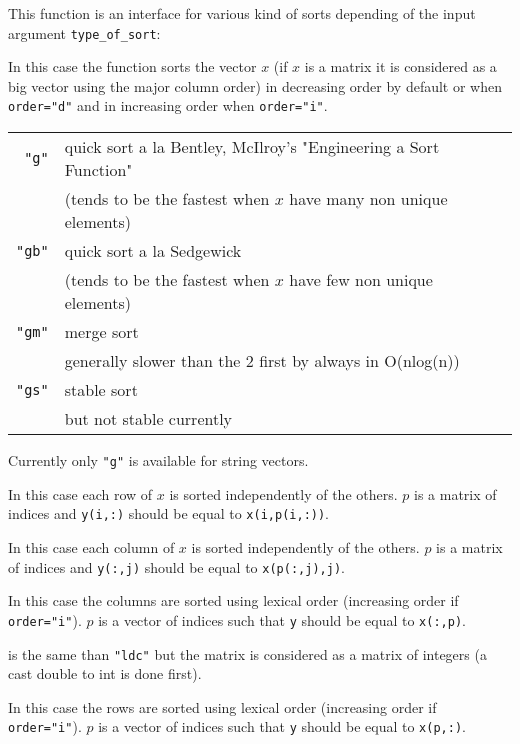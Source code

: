 \begin{mandescription}
This function is an interface for various kind of sorts depending of
the input argument \verb+type_of_sort+:

In this case the function sorts the vector $x$ (if $x$ is a matrix
it is considered as a big vector using the major column order) in 
decreasing order by default or when \verb+order="d"+ and in increasing
order when \verb+order="i"+. 

\begin{tabular}{|r|l|}
\hline
\verb+"g"+  &  quick sort a la Bentley, McIlroy's "Engineering a Sort Function" \\
            &  (tends to be the fastest when $x$ have many non unique elements) \\ 
\hline
\verb+"gb"+  &  quick sort a la Sedgewick \\
            &  (tends to be the fastest when $x$ have few non unique elements) \\ 
\hline
\verb+"gm"+  &  merge sort \\
             &  generally slower than the 2 first by always in  O(nlog(n)) \\
\hline
\verb+"gs"+  &  stable sort \\
             &  but not stable currently \\ 
\hline
\end{tabular}

Currently only \verb+"g"+ is available for string vectors.

In this case each row of $x$ is sorted independently of the others.
$p$ is a matrix of indices and \verb+y(i,:)+ should be equal to
\verb+x(i,p(i,:))+. 

In this case each column of $x$ is sorted independently of the others.
$p$ is a matrix of indices and \verb+y(:,j)+ should be equal to
\verb+x(p(:,j),j)+. 

In this case the columns are sorted using lexical order (increasing 
order if \verb+order="i"+). $p$ is a vector of indices such that \verb+y+ should be equal to
\verb+x(:,p)+. 

is the same than \verb+"ldc"+ but the matrix is considered as a matrix
of integers (a cast double to int is done first).

In this case the rows are sorted using lexical order (increasing 
order if \verb+order="i"+). $p$ is a vector of indices such that \verb+y+ should be equal to
\verb+x(p,:)+. 


\end{mandescription}
